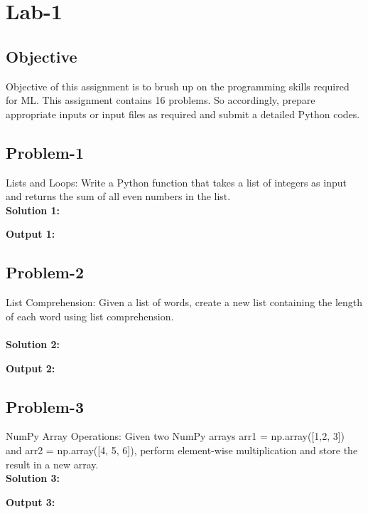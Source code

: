 \chapter{Lab-1}
\section{Objective}
Objective of this assignment is to brush up on the programming skills required for ML. This assignment contains 16 problems. So accordingly, prepare appropriate inputs or input files as required and submit a detailed Python codes.

\section{Problem-1}
Lists and Loops: Write a Python function that takes a list of integers as input and returns the sum of all even numbers in the list.\\

\textbf{Solution 1: }


\textbf{Output 1: }
\\

\section{Problem-2}
List Comprehension: Given a list of words, create a new list containing the length of each word using list comprehension.\\\\

\textbf{Solution 2: }


\textbf{Output 2: }
\\

\section{Problem-3}
NumPy Array Operations: Given two NumPy arrays arr1 = np.array([1,2, 3]) and arr2 = np.array([4, 5, 6]), perform element-wise multiplication and store the result in a new array.\\

\textbf{Solution 3: }


\textbf{Output 3: }
\\

